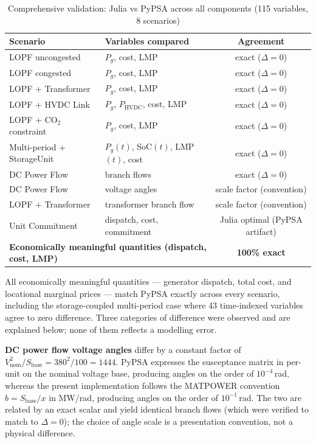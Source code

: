 \begin{table}[H]
\centering
\caption{Comprehensive validation: Julia vs PyPSA across all components (115 variables, 8 scenarios)}
\label{tab:full_validation}
\begin{tabular}{llc}
\toprule
\textbf{Scenario} & \textbf{Variables compared} & \textbf{Agreement} \\
\midrule
LOPF uncongested          & $P_g$, cost, LMP            & exact ($\Delta = 0$) \\
LOPF congested            & $P_g$, cost, LMP            & exact ($\Delta = 0$) \\
LOPF + Transformer        & $P_g$, cost, LMP            & exact ($\Delta = 0$) \\
LOPF + HVDC Link          & $P_g$, $P_\text{HVDC}$, cost, LMP & exact ($\Delta = 0$) \\
LOPF + CO$_2$ constraint  & $P_g$, cost, LMP            & exact ($\Delta = 0$) \\
Multi-period + StorageUnit & $P_g(t)$, SoC$(t)$, LMP$(t)$, cost & exact ($\Delta = 0$) \\
DC Power Flow             & branch flows                & exact ($\Delta = 0$) \\
DC Power Flow             & voltage angles              & scale factor (convention) \\
LOPF + Transformer        & transformer branch flow     & scale factor (convention) \\
Unit Commitment           & dispatch, cost, commitment  & Julia optimal (PyPSA artifact) \\
\midrule
\multicolumn{2}{l}{\textbf{Economically meaningful quantities (dispatch, cost, LMP)}} & \textbf{100\% exact} \\
\bottomrule
\end{tabular}
\end{table}

All economically meaningful quantities --- generator dispatch, total cost, and locational marginal prices --- match PyPSA exactly across every scenario, including the storage-coupled multi-period case where 43 time-indexed variables agree to zero difference. Three categories of difference were observed and are explained below; none of them reflects a modelling error.

\textbf{DC power flow voltage angles} differ by a constant factor of $V_\text{nom}^2 / S_\text{base} = 380^2/100 = 1444$. PyPSA expresses the susceptance matrix in per-unit on the nominal voltage base, producing angles on the order of $10^{-4}$\,rad, whereas the present implementation follows the MATPOWER convention $b = S_\text{base}/x$ in MW/rad, producing angles on the order of $10^{-1}$\,rad. The two are related by an exact scalar and yield identical branch flows (which were verified to match to $\Delta = 0$); the choice of angle scale is a presentation convention, not a physical difference.

